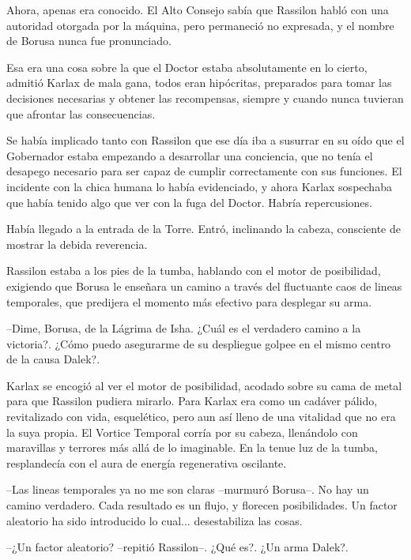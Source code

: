 Ahora, apenas era conocido. El Alto Consejo sabía que Rassilon habló con una autoridad otorgada por la máquina, pero permaneció no expresada, y el nombre de Borusa nunca fue pronunciado.

Esa era una cosa sobre la que el Doctor estaba absolutamente en lo cierto, admitió Karlax de mala gana, todos eran hipócritas, preparados para tomar las decisiones necesarias y obtener las recompensas, siempre y cuando nunca tuvieran que afrontar las consecuencias.

Se había implicado tanto con Rassilon que ese día iba a susurrar en su oído que el Gobernador estaba empezando a desarrollar una conciencia, que no tenía el desapego necesario para ser capaz de cumplir correctamente con sus funciones. El incidente con la chica humana lo había evidenciado, y ahora Karlax sospechaba que había tenido algo que ver con la fuga del Doctor. Habría repercusiones.

Había llegado a la entrada de la Torre. Entró, inclinando la cabeza, consciente de mostrar la debida reverencia.

Rassilon estaba a los pies de la tumba, hablando con el motor de posibilidad, exigiendo que Borusa le enseñara un camino a través del fluctuante caos de lineas temporales, que predijera el momento más efectivo para desplegar su arma. 



--Dime, Borusa, de la Lágrima de Isha. ¿Cuál es el verdadero camino a la victoria?. ¿Cómo puedo asegurarme de su despliegue golpee en el mismo centro de la causa Dalek?.



Karlax se encogió al ver el motor de posibilidad, acodado sobre su cama de metal para que Rassilon pudiera mirarlo. Para Karlax era como un cadáver pálido, revitalizado con vida, esquelético, pero aun así lleno de una vitalidad que no era la suya propia. El Vortice Temporal corría por su cabeza, llenándolo con maravillas y terrores más allá de lo imaginable. En la tenue luz de la tumba, resplandecía con el aura de energía regenerativa oscilante.



--Las lineas temporales ya no me son claras --murmuró Borusa--. No hay un camino verdadero. Cada resultado es un flujo, y florecen posibilidades. Un factor aleatorio ha sido introducido lo cual... desestabiliza las cosas.

--¿Un factor aleatorio? --repitió Rassilon--. ¿Qué es?. ¿Un arma Dalek?.

